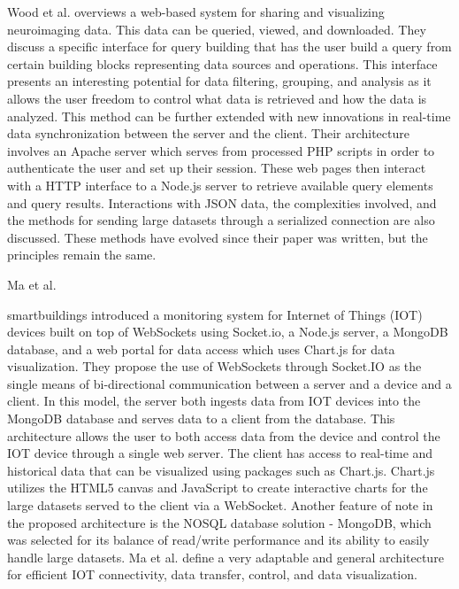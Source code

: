 Wood et al. \cite{neuro} overviews a web-based system for sharing and visualizing neuroimaging data.  This data can be queried, viewed, and downloaded.  They discuss a specific interface for query building that has the user build a query from certain building blocks representing data sources and operations.  This interface presents an interesting potential for data filtering, grouping, and analysis as it allows the user freedom to control what data is retrieved and how the data is analyzed.  This method can be further extended with new innovations in real-time data synchronization between the server and the client.  Their architecture involves an Apache server which serves from processed PHP scripts in order to authenticate the user and set up their session.  These web pages then interact with a HTTP interface to a Node.js server to retrieve available query elements and query results.  Interactions with JSON data, the complexities involved, and the methods for sending large datasets through a serialized connection are also discussed.  These methods have evolved since their paper was written, but the principles remain the same. \par
Ma et al. \par{smartbuildings} introduced a monitoring system for Internet of Things (IOT) devices built on top of WebSockets using Socket.io, a Node.js server, a MongoDB database, and a web portal for data access which uses Chart.js for data visualization.  They propose the use of WebSockets through Socket.IO as the single means of bi-directional communication between a server and a device and a client.  In this model, the server both ingests data from IOT devices into the MongoDB database and serves data to a client from the database.  This architecture allows the user to both access data from the device and control the IOT device through a single web server.  The client has access to real-time and historical data that can be visualized using packages such as Chart.js.  Chart.js utilizes the HTML5 canvas and JavaScript to create interactive charts for the large datasets served to the client via a WebSocket.  Another feature of note in the proposed architecture is the NOSQL database solution - MongoDB, which was selected for its balance of read/write performance and its ability to easily handle large datasets.  Ma et al. \cite{smartbuildings}  define a very adaptable and general architecture for efficient IOT connectivity, data transfer, control, and data visualization. \par
